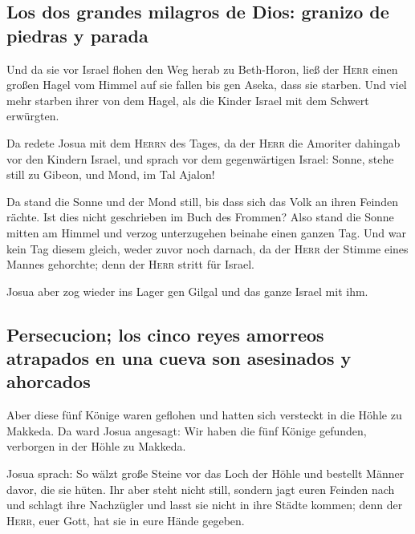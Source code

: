 \hypertarget{los-dos-grandes-milagros-de-dios-granizo-de-piedras-y-parada}{%
\subsection{Los dos grandes milagros de Dios: granizo de piedras y
parada}\label{los-dos-grandes-milagros-de-dios-granizo-de-piedras-y-parada}}

 Und da sie vor Israel flohen den Weg herab zu
Beth-Horon, ließ der \textsc{Herr} einen großen Hagel vom Himmel auf sie
fallen bis gen Aseka, dass sie starben. Und viel mehr starben ihrer von
dem Hagel, als die Kinder Israel mit dem Schwert erwürgten.

 Da redete Josua mit dem \textsc{Herrn} des Tages, da der
\textsc{Herr} die Amoriter dahingab vor den Kindern Israel, und sprach
vor dem gegenwärtigen Israel: Sonne, stehe still zu Gibeon, und Mond, im
Tal Ajalon!

 Da stand die Sonne und der Mond still, bis dass sich das
Volk an ihren Feinden rächte. Ist dies nicht geschrieben im Buch des
Frommen? Also stand die Sonne mitten am Himmel und verzog unterzugehen
beinahe einen ganzen Tag.  Und war kein Tag diesem
gleich, weder zuvor noch darnach, da der \textsc{Herr} der Stimme eines
Mannes gehorchte; denn der \textsc{Herr} stritt für Israel.

 Josua aber zog wieder ins Lager gen Gilgal und das ganze
Israel mit ihm.

\hypertarget{persecucion-los-cinco-reyes-amorreos-atrapados-en-una-cueva-son-asesinados-y-ahorcados}{%
\subsection{Persecucion; los cinco reyes amorreos atrapados en una cueva
son asesinados y
ahorcados}\label{persecucion-los-cinco-reyes-amorreos-atrapados-en-una-cueva-son-asesinados-y-ahorcados}}

 Aber diese fünf Könige waren geflohen und hatten sich
versteckt in die Höhle zu Makkeda.  Da ward Josua
angesagt: Wir haben die fünf Könige gefunden, verborgen in der Höhle zu
Makkeda.

 Josua sprach: So wälzt große Steine vor das Loch der
Höhle und bestellt Männer davor, die sie hüten.  Ihr aber
steht nicht still, sondern jagt euren Feinden nach und schlagt ihre
Nachzügler und lasst sie nicht in ihre Städte kommen; denn der
\textsc{Herr}, euer Gott, hat sie in eure Hände gegeben.

